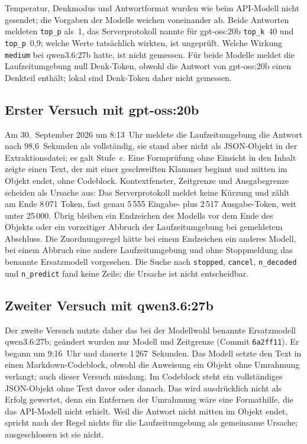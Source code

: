 \documentclass[11pt,a4paper]{report}
\begin{document}
Temperatur, Denkmodus und Antwortformat wurden wie beim API-Modell nicht
gesendet; die Vorgaben der Modelle weichen voneinander ab. Beide Antworten
meldeten \texttt{top\_p} als~1, das Serverprotokoll nannte für
gpt-oss:20b \texttt{top\_k}~40 und \texttt{top\_p}~0,9; welche Werte
tatsächlich wirkten, ist ungeprüft. Welche Wirkung \texttt{medium}
bei qwen3.6:27b hatte, ist nicht gemessen. Für beide Modelle meldet die
Laufzeitumgebung null Denk-Token, obwohl die Antwort von gpt-oss:20b
einen Denkteil enthält; lokal sind Denk-Token daher nicht gemessen.

\subsection{Erster Versuch mit gpt-oss:20b}
\label{subsec:pilot-gptoss}

Am 30.~September 2026 um 8:13~Uhr meldete die Laufzeitumgebung die
Antwort nach 98,6~Sekunden als vollständig, sie stand aber nicht als
JSON-Objekt in der Extraktionsdatei; es galt Stufe~c. Eine Formprüfung
ohne Einsicht in den Inhalt zeigte einen Text, der mit einer
geschweiften Klammer beginnt und mitten im Objekt endet, ohne
Codeblock. Kontextfenster, Zeitgrenze und Ausgabegrenze scheiden als
Ursache aus: Das Serverprotokoll meldet keine Kürzung und zählt am Ende
8\,071 Token, fast genau 5\,555 Eingabe- plus 2\,517 Ausgabe-Token, weit
unter 25\,000. Übrig bleiben ein Endzeichen des Modells vor dem Ende des
Objekts oder ein vorzeitiger Abbruch der Laufzeitumgebung bei gemeldetem
Abschluss. Die Zuordnungsregel hätte bei einem Endzeichen ein anderes
Modell, bei einem Abbruch eine andere Laufzeitumgebung und ohne
Stoppmeldung das benannte Ersatzmodell vorgesehen. Die Suche nach
\texttt{stopped}, \texttt{cancel}, \texttt{n\_decoded} und
\texttt{n\_predict} fand keine Zeile; die Ursache ist nicht entscheidbar.

\subsection{Zweiter Versuch mit qwen3.6:27b}
\label{subsec:pilot-qwen}

Der zweite Versuch nutzte daher das bei der Modellwahl benannte
Ersatzmodell qwen3.6:27b; geändert wurden nur Modell und Zeitgrenze
(Commit \texttt{6a2ff11}). Er begann um 9:16~Uhr und dauerte
1\,267~Sekunden. Das Modell setzte den Text in einen Markdown-Codeblock,
obwohl die Anweisung ein Objekt ohne Umrahmung verlangt; auch dieser
Versuch misslang. Im Codeblock steht ein vollständiges JSON-Objekt ohne
Text davor oder danach. Das wird ausdrücklich nicht als Erfolg
gewertet, denn ein Entfernen der Umrahmung wäre eine Formathilfe, die
das API-Modell nicht erhielt. Weil die Antwort nicht mitten im Objekt
endet, spricht nach der Regel nichts für die Laufzeitumgebung als
gemeinsame Ursache; ausgeschlossen ist sie nicht.
\end{document}
